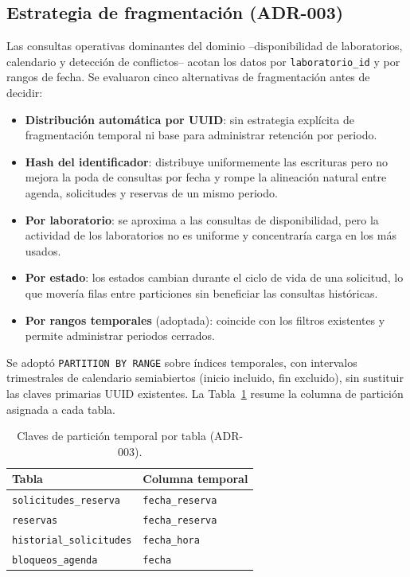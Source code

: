 \documentclass[10pt,twocolumn]{article}
\begin{document}
\subsection{Estrategia de fragmentación (ADR-003)}


Las consultas operativas dominantes del dominio --disponibilidad de
laboratorios, calendario y detección de conflictos-- acotan los datos por
\texttt{laboratorio\_id} y por rangos de fecha. Se evaluaron cinco
alternativas de fragmentación antes de decidir:

\begin{itemize}[leftmargin=*,itemsep=1pt]
  \item \textbf{Distribución automática por UUID}: sin estrategia explícita
  de fragmentación temporal ni base para administrar retención por periodo.
  \item \textbf{Hash del identificador}: distribuye uniformemente las
  escrituras pero no mejora la poda de consultas por fecha y rompe la
  alineación natural entre agenda, solicitudes y reservas de un mismo
  periodo.
  \item \textbf{Por laboratorio}: se aproxima a las consultas de
  disponibilidad, pero la actividad de los laboratorios no es uniforme y
  concentraría carga en los más usados.
  \item \textbf{Por estado}: los estados cambian durante el ciclo de vida
  de una solicitud, lo que movería filas entre particiones sin beneficiar
  las consultas históricas.
  \item \textbf{Por rangos temporales} (adoptada): coincide con los
  filtros existentes y permite administrar periodos cerrados.
\end{itemize}

Se adoptó \texttt{PARTITION BY RANGE} sobre índices temporales, con
intervalos trimestrales de calendario semiabiertos (inicio incluido, fin
excluido), sin sustituir las claves primarias UUID existentes. La
Tabla~\ref{tab:fragmentacion} resume la columna de partición asignada a
cada tabla.

\begin{table}[t]
\centering
\caption{Claves de partición temporal por tabla (ADR-003).}
\label{tab:fragmentacion}
\small
\begin{tabular}{@{}ll@{}}
\toprule
\textbf{Tabla} & \textbf{Columna temporal} \\
\midrule
\texttt{solicitudes\_reserva} & \texttt{fecha\_reserva} \\
\texttt{reservas} & \texttt{fecha\_reserva} \\
\texttt{historial\_solicitudes} & \texttt{fecha\_hora} \\
\texttt{bloqueos\_agenda} & \texttt{fecha} \\
\bottomrule
\end{tabular}
\end{table}
\end{document}
